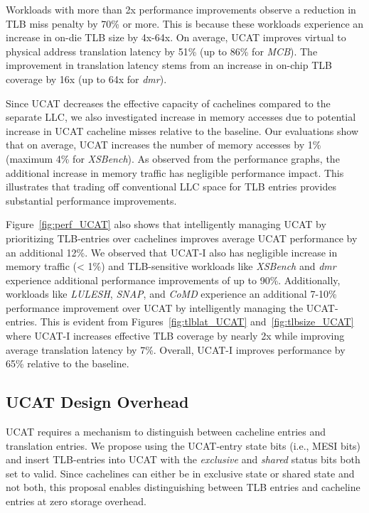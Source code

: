 Workloads with more than 2x performance improvements observe a
reduction in TLB miss penalty by 70\% or more. This is because these
workloads experience an increase in on-die TLB size by 4x-64x. On
average, UCAT improves virtual to physical address translation latency
by 51\% (up to 86\% for {\em MCB}). The improvement in translation
latency stems from an increase in on-chip TLB coverage by 16x (up to
64x for {\em dmr}).

Since UCAT decreases the effective capacity of cachelines compared to
the separate LLC, we also investigated increase in memory accesses due
to potential increase in UCAT cacheline misses relative to the
baseline. Our evaluations show that on average, UCAT increases the
number of memory accesses by 1\% (maximum 4\% for {\em XSBench}). As
observed from the performance graphs, the additional increase in
memory traffic has negligible performance impact. This illustrates
that trading off conventional LLC space for TLB entries provides
substantial performance improvements.

Figure~\ref{fig:perf_UCAT} also shows that intelligently managing UCAT
by prioritizing TLB-entries over cachelines improves average UCAT
performance by an additional 12\%. We observed that UCAT-I also has
negligible increase in memory traffic (< 1\%) and TLB-sensitive
workloads like {\em XSBench} and {\em dmr} experience additional
performance improvements of up to 90\%. Additionally, workloads like
{\em LULESH}, {\em SNAP}, and {\em CoMD} experience an additional
7-10\% performance improvement over UCAT by intelligently managing the
UCAT-entries. This is evident from Figures~\ref{fig:tlblat_UCAT}
and~\ref{fig:tlbsize_UCAT} where UCAT-I increases effective TLB
coverage by nearly 2x while improving average translation latency by
7\%. Overall, UCAT-I improves performance by 65\% relative to the
baseline.

\subsection{UCAT Design Overhead}

\noindent UCAT requires a mechanism to distinguish between cacheline
entries and translation entries. We propose using the UCAT-entry state
bits (i.e., MESI bits) and insert TLB-entries into UCAT with the {\em
exclusive} and {\em shared} status bits both set to valid. Since
cachelines can either be in exclusive state or shared state and not
both, this proposal enables distinguishing between TLB entries and
cacheline entries at zero storage overhead. 

